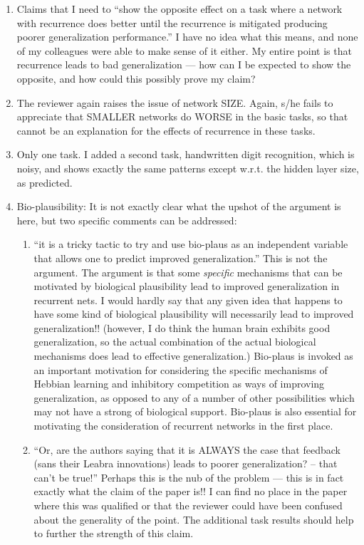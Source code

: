 \documentclass [11pt]{letter}
\begin{document}
\begin{letter}
\begin{enumerate}
\item Claims that I need to ``show the opposite effect on a task where
  a network with recurrence does better until the recurrence is
  mitigated producing poorer generalization performance.''  I have no
  idea what this means, and none of my colleagues were able to make
  sense of it either.  My entire point is that recurrence leads to bad
  generalization --- how can I be expected to show the opposite, and
  how could this possibly prove my claim?
  
\item The reviewer again raises the issue of network SIZE.  Again,
  s/he fails to appreciate that SMALLER networks do WORSE in the basic
  tasks, so that cannot be an explanation for the effects of
  recurrence in these tasks.
   
\item Only one task.  I added a second task, handwritten digit
  recognition, which is noisy, and shows exactly the same patterns
  except w.r.t. the hidden layer size, as predicted.
  
\item Bio-plausibility: It is not exactly clear what the upshot of the
  argument is here, but two specific comments can be addressed:
  \begin{enumerate}
  \item ``it is a tricky tactic to try and use bio-plaus as an
    independent variable that allows one to predict improved
    generalization.''  This is not the argument.  The argument is that
    some {\em specific} mechanisms that can be motivated by biological
    plausibility lead to improved generalization in recurrent nets.  I
    would hardly say that any given idea that happens to have some
    kind of biological plausibility will necessarily lead to improved
    generalization!!  (however, I do think the human brain exhibits
    good generalization, so the actual combination of the actual
    biological mechanisms does lead to effective generalization.)
    Bio-plaus is invoked as an important motivation for considering
    the specific mechanisms of Hebbian learning and inhibitory
    competition as ways of improving generalization, as opposed to any
    of a number of other possibilities which may not have a strong of
    biological support.  Bio-plaus is also essential for motivating
    the consideration of recurrent networks in the first place.
  \item ``Or, are the authors saying that it is ALWAYS the case that
    feedback (sans their Leabra innovations) leads to poorer
    generalization? -- that can't be true!''  Perhaps this is the nub
    of the problem --- this is in fact exactly what the claim of the
    paper is!!  I can find no place in the paper where this was
    qualified or that the reviewer could have been confused about the
    generality of the point.   The additional task results should help
    to further the strength of this claim.
  \end{enumerate}
\end{enumerate}


\end{letter}
\end{document}
